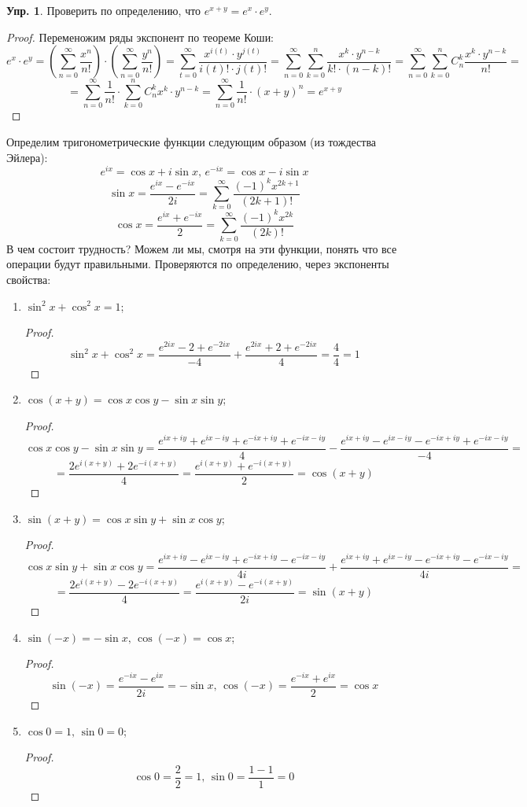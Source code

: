 \documentclass[12pt]{article}
\theoremstyle{definition}
\newtheorem{exrc}{Упр.}
\newcommand{\ddsum}[2]{\displaystyle\sum\limits_{#1}^{#2}}
\begin{document}
\begin{exrc}
	Проверить по определению, что $e^{x+y} = e^x{\cdot}e^y$.
\end{exrc}
\begin{proof}
	Переменожим ряды экспонент по теореме Коши:
	$$
		e^x{\cdot}e^y = \left(\ddsum{n = 0}{\infty}\dfrac{x^n}{n!}\right){\cdot}\left(\ddsum{n = 0}{\infty}\dfrac{y^n}{n!}\right) = \ddsum{t = 0}{\infty}\dfrac{x^{i(t)}{\cdot}y^{j(t)}}{i(t)!{\cdot}j(t)!}= \ddsum{n = 0}{\infty}\ddsum{k = 0}{n}\dfrac{x^k {\cdot}y^{n - k}}{k!{\cdot}(n-k)!} = \ddsum{n = 0}{\infty}\ddsum{k = 0}{n}C_n^k \dfrac{x^k{\cdot}y^{n-k}}{n!} =
	$$
	$$
		=	\ddsum{ n = 0}{\infty}\dfrac{1}{n!}{\cdot}\ddsum{k = 0}{n}C_n^k x^k{\cdot}y^{n-k} = \ddsum{n = 0}{\infty}\dfrac{1}{n!}{\cdot}(x + y)^n  = e^{x + y} 
	$$
\end{proof}
Определим тригонометрические функции следующим образом (из тождества Эйлера):
$$
	e^{ix} = \cos{x} + i \sin{x}, \, e^{-ix} = \cos{x} - i \sin{x}
$$
$$
	\sin{x} = \dfrac{e^{ix} - e^{-ix}}{2i} = \ddsum{k = 0}{\infty}\dfrac{(-1)^kx^{2k+1}}{(2k+1)!} 
$$
$$
	\cos{x} = \dfrac{e^{ix} + e^{-ix}}{2} = \ddsum{k = 0}{\infty}\dfrac{(-1)^k x^{2k}}{(2k)!}
$$
В чем состоит трудность? Можем ли мы, смотря на эти функции, понять что все операции будут правильными. Проверяются по определению, через экспоненты свойства:
\begin{enumerate}[label=(\arabic*)]
	\item $\sin^2{x} + \cos^2{x} = 1$;
	\begin{proof}
		$$
			\sin^2{x} + \cos^2{x} = \dfrac{e^{2ix} - 2 + e^{-2ix}}{-4} + \dfrac{e^{2ix} + 2 + e^{-2ix}}{4} = \dfrac{4}{4} = 1
		$$
	\end{proof}
	\item $\cos{(x + y)} = \cos{x}\cos{y}- \sin{x}\sin{y}$;
	\begin{proof}
		$$
			\cos{x}\cos{y}- \sin{x}\sin{y} = \dfrac{e^{ix + iy} + e^{ix - iy} + e^{-ix + iy} + e^{-ix - iy} }{4} - \dfrac{e^{ix + iy} - e^{ix - iy} - e^{-ix + iy} + e^{-ix - iy}}{-4} =
		$$
		$$
			=	\dfrac{2e^{i(x+y)} + 2e^{-i(x + y)}}{4} = \dfrac{e^{i(x+y)} + e^{-i(x + y)}}{2} = \cos{(x + y)}
		$$
	\end{proof}
	\item $\sin{(x + y)} = \cos{x}\sin{y} + \sin{x} \cos{y}$;
	\begin{proof}
		$$
			\cos{x}\sin{y} + \sin{x} \cos{y} = \dfrac{e^{ix + iy} - e^{ix - iy} + e^{-ix + iy} - e^{-ix - iy} }{4i} + \dfrac{e^{ix + iy} + e^{ix - iy} - e^{-ix + iy} - e^{-ix - iy}}{4i} =
		$$
		$$
			=	\dfrac{2e^{i(x+y)} - 2e^{-i(x + y)}}{4} = \dfrac{e^{i(x+y)} - e^{-i(x + y)}}{2i} = \sin{(x + y)}
		$$
	\end{proof}
	\item $\sin{(-x)} = - \sin{x}, \, \cos{(-x)} = \cos{x}$;
	\begin{proof}
		$$
			\sin{(-x)} = \dfrac{e^{-ix} - e^{ix}}{2i} = -\sin{x}, \, \cos{(-x)} = \dfrac{e^{-ix} + e^{ix}}{2} = \cos{x}
		$$
	\end{proof}
	\item $\cos{0} = 1, \, \sin{0} = 0$;
	\begin{proof}
		$$
			\cos{0} = \dfrac{2}{2} = 1, \, \sin{0} = \dfrac{1 - 1}{1} = 0
		$$		
	\end{proof}
\end{enumerate}
\end{document}
